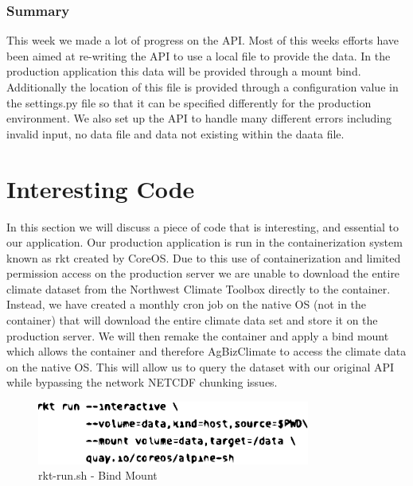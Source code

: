 \documentclass[onecolumn, draftclsnofoot,10pt, compsoc]{article}
\begin{document}
			\subsubsection{Summary} This week we made a lot of progress on the API. Most of this weeks efforts have been aimed at re-writing the API to use a local file to provide the data. In the production application this data will be provided through a mount bind. Additionally the location of this file is provided through a configuration value in the settings.py file so that it can be specified differently for the production environment. We also set up the API to handle many different errors including invalid input, no data file and data not existing within the daata file.\\
			
\section{Interesting Code}
In this section we will discuss  a piece of code that is interesting, and essential to our application. Our production application is run in the containerization system known as rkt created by CoreOS. Due to this use of containerization and limited permission access on the production server we are unable to download the entire climate dataset from the Northwest Climate Toolbox directly to the container. Instead, we have created a monthly cron job on the native OS (not in the container) that will download the entire climate data set and store it on the production server. We will then remake the container and apply a bind mount which allows the container and therefore AgBizClimate to access the climate data on the native OS. This will allow us to query the dataset with our original API while bypassing the network NETCDF chunking issues.

  \begin{figure}[!htb]
	  \includegraphics[width=0.8\textwidth,natwidth=610,natheight=642]{interesting_code.eps}
	  \caption{rkt-run.sh - Bind Mount}
  \end{figure}
\end{document}
